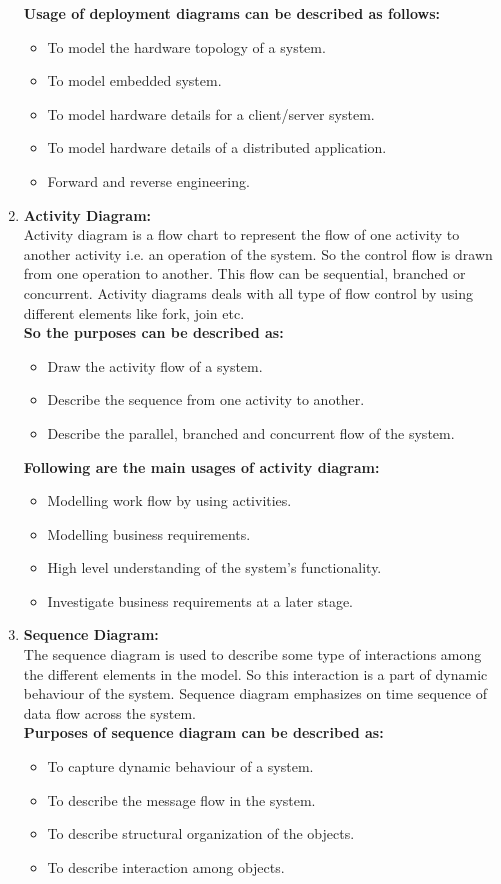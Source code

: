 \documentclass[12pt]{extreport}
\begin{document}
\begin{enumerate}
\textbf{Usage of deployment diagrams can be described as follows:}
\begin{itemize}
	\item To model the hardware topology of a system.
	\item To model embedded system.
	\item To model hardware details for a client/server system.
	\item To model hardware details of a distributed application.
	\item Forward and reverse engineering.
\end{itemize}

\item \textbf{Activity Diagram:}\\
Activity diagram is a flow chart to represent the flow of one activity to another activity i.e. an operation of the system. So the control flow is drawn from one operation to another. This flow can be sequential, branched or concurrent. Activity diagrams deals with all type of flow control by using different elements like fork, join etc.\\
\newline
\textbf{So the purposes can be described as:}
\begin{itemize}
	\item Draw the activity flow of a system.
	\item Describe the sequence from one activity to another.
	\item Describe the parallel, branched and concurrent flow of the system.
\end{itemize}
\textbf{Following are the main usages of activity diagram:}
\begin{itemize}
	\item Modelling work flow by using activities.
	\item Modelling business requirements.
	\item High level understanding of the system's functionality.
	\item Investigate business requirements at a later stage.
\end{itemize}

\item \textbf{Sequence Diagram:}\\
The sequence diagram is used to describe some type of interactions among the different elements in the model. So this interaction is a part of dynamic behaviour of the system. Sequence diagram emphasizes on time sequence of data flow across the system.\\
\newline
\textbf{Purposes of sequence diagram can be described as:}
\begin{itemize}
    \item To capture dynamic behaviour of a system.
	\item To describe the message flow in the system.
	\item To describe structural organization of the objects.
	\item To describe interaction among objects.
\end{itemize}
	

\end{enumerate}
\end{document}
